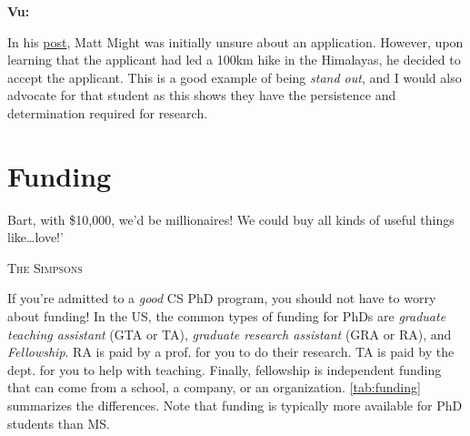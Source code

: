\documentclass[oneside,11pt,dvipsnames]{book}
\newenvironment{commentbox}[1][]{
  \small
  \begin{mybox}
    {\small \textbf{#1}}
  }{
  \end{mybox}
}
\def\chapterinfo#1{%
  \addcontentsline{toc}{chapterinfo}{%
    \noexpand\numberline{}\color{black}{#1}}%
}
\begin{document}
\begin{commentbox}[Vu:]
In his \href{https://matt.might.net/articles/how-to-apply-and-get-in-to-graduate-school-in-science-mathematics-engineering-or-computer-science/}{post}, Matt Might was initially unsure about an application. However, upon learning that the applicant had led a 100km hike in the Himalayas, he decided to accept the applicant.  This is a good example of being \emph{stand out}, and I would also advocate for that student as this shows they have the persistence and determination required for research.
\end{commentbox}



\chapter{Funding}\label{sec:funding}
\chapterinfo{TAs, RAs, and fellowships are main funding sources for PhDs.  TAs are provided by the department to help with classes. RAs are given by profs. to help with their research.  Fellowships, provided by the university, department, or external sources such as government or industry, give move flexibility but can be very competitive.}

\epigraph{Bart, with \$10,000, we’d be millionaires! We could buy all kinds of useful things like…love!’}{\textsc{The Simpsons}}
If you're admitted to a \emph{good} CS PhD program, you should not have to worry about funding!
In the US, the common types of funding for PhDs are \emph{graduate teaching assistant} (GTA or TA), \emph{graduate research assistant} (GRA or RA), and \emph{Fellowship}.
RA is paid by a prof. for you to do their research. TA is paid by the dept. for you to help with teaching. Finally, fellowship is independent funding that can come from a school, a company, or an organization. \autoref{tab:funding} summarizes the differences.
Note that funding is typically more available for PhD students than
MS.
\end{document}
